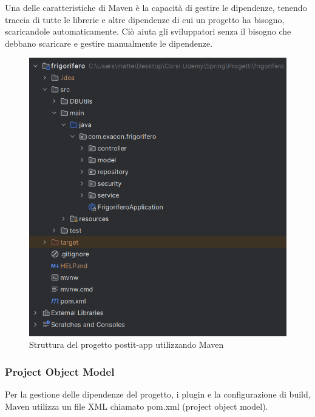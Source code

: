 Una delle caratteristiche di Maven è la capacità di gestire le dipendenze, tenendo traccia di tutte le librerie e altre dipendenze di cui un progetto ha bisogno, scaricandole automaticamente.
Ciò aiuta gli sviluppatori senza il bisogno che debbano scaricare e gestire manualmente le dipendenze.\cite{maven}
\begin{figure}[h]
    \centering
    \includegraphics[scale=0.8]{images/esempio struttura progetto maven.png}
    \caption{Struttura del progetto postit-app utilizzando Maven}
    \label{fig:organizzazione-progetto}
\end{figure}

\newpage
\subsubsection{Project Object Model}
Per la gestione delle dipendenze del progetto, i plugin e la configurazione di build, Maven utilizza un file XML chiamato pom.xml (project object model).

